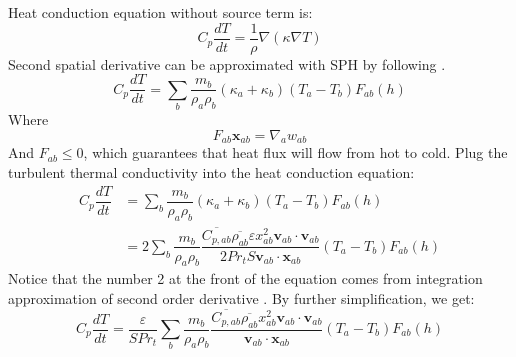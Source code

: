 \documentclass[journal abbreviation, manuscript]{copernicus}
\begin{document}
Heat conduction equation without source term is:
\begin{equation}
C_p \dfrac{dT}{dt} = \dfrac{1}{\rho} \nabla (\kappa \nabla T)
\end{equation}
Second spatial derivative can be approximated with SPH by following \citet{monaghan2005smoothed}. 
\begin{equation}
C_p \dfrac{dT}{dt} = \sum_b \dfrac{m_b}{\rho_a \rho_b} (\kappa_a + \kappa_b) (T_a - T_b) F_{ab} (h)
\end{equation}
Where
\begin{equation}
F_{ab} \textbf{x}_{ab} = \nabla _a w_{ab}
\end{equation}
And  $F_{ab} \leq 0$, which guarantees that heat flux will flow from hot to cold.
Plug the turbulent thermal conductivity into the heat conduction equation:
\begin{equation}
\begin{split}
C_p \dfrac{dT}{dt} 
& = \sum_b \dfrac{m_b}{\rho_a \rho_b} (\kappa_a + \kappa_b) (T_a - T_b) F_{ab} (h) \\
 &= 2 \sum_b \dfrac{m_b}{\rho_a \rho_b} \dfrac{\overline{C_{p,ab}} \overline{\rho_{ab}} \varepsilon x_{ab}^2 \textbf{v}_{ab} \cdot \textbf{v}_{ab}}{2 Pr_t  S \textbf{v}_{ab} \cdot \textbf{x}_{ab} } (T_a - T_b) F_{ab} (h)
\end{split}
\end{equation}
Notice that the number 2 at the front of the equation comes from integration approximation of second order derivative \citep {cleary1999conduction}. By further simplification, we get:
\begin{equation}
C_p \dfrac{dT}{dt}
 =\dfrac{\varepsilon}{S  Pr_t}  \sum_b \dfrac{m_b}{\rho_a \rho_b} \dfrac{\overline{C_{p,ab}} \overline{\rho_{ab}} x_{ab}^2 \textbf{v}_{ab} \cdot \textbf{v}_{ab}}{\textbf{v}_{ab} \cdot \textbf{x}_{ab}} (T_a - T_b) F_{ab} (h)
\end{equation}
\end{document}
